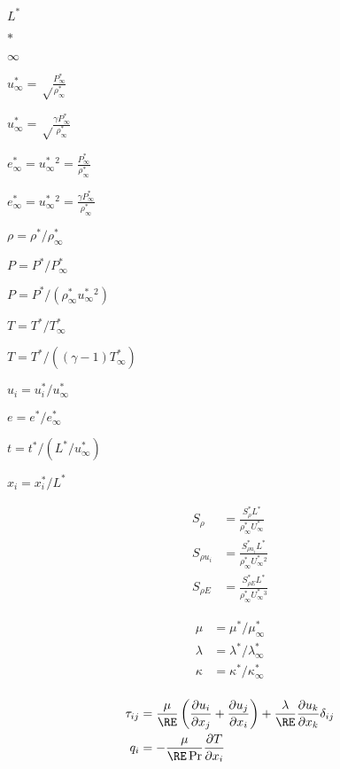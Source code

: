 \documentclass{article}
\begin{document}
$L^*$
\pagebreak

$*$
\pagebreak

$\infty$
\pagebreak

$ u^*_\infty = \sqrt \frac{P^*_\infty}{\rho^*_\infty} $
\pagebreak

$ u^*_\infty = \sqrt \frac{\gamma P^*_\infty}{\rho^*_\infty} $
\pagebreak

$ e^*_\infty = u^*_\infty^2 = \frac{P^*_\infty}{\rho^*_\infty} $
\pagebreak

$ e^*_\infty = u^*_\infty^2 = \frac{\gamma P^*_\infty}{\rho^*_\infty} $
\pagebreak

$ \rho = \rho^* /\rho^*_\infty $
\pagebreak

$ P = P^* /P^*_\infty $
\pagebreak

$ P = P^* /(\rho^*_\infty u^*_\infty^2) $
\pagebreak

$ T = T^* /T^*_\infty $
\pagebreak

$ T = T^* /((\gamma-1)T^*_\infty) $
\pagebreak

$ u_i = u^*_i /u^*_\infty $
\pagebreak

$ e = e^* /e^*_\infty $
\pagebreak

$ t = t^* /(L^* / u^*_\infty) $
\pagebreak

$ x_i = x_i^* /L^* $
\pagebreak

\[\begin{align} S_\rho &= \frac{S^*_\rho L^*}{\rho^*_\infty U^*_\infty} \\ S_{\rho u_i} &= \frac{S^*_{\rho u_i } L^*}{\rho^*_\infty U^*_\infty^2 } \\ S_{\rho E} &= \frac{S^*_{\rho E} L^*}{\rho^*_\infty U^*_\infty^3} \end{align} \]
\pagebreak

\[\begin{align} \mu &= \mu^* /\mu^*_\infty \\ \lambda &= \lambda^* /\lambda^*_\infty \\ \kappa &= \kappa^* /\kappa^*_\infty \\ \end{align} \]
\pagebreak

\[\begin{align} \tau_{ij} &= \frac{\mu}{\RE} \left(\frac{\partial u_i}{\partial x_j} + \frac{\partial u_j}{\partial x_i}\right) + \frac{\lambda}{\RE} \frac{\partial u_k}{\partial x_k}\delta_{ij} \\ q_i &= - \frac{\mu}{\RE \Pr} \frac{\partial T}{\partial x_i} \end{align} \]
\pagebreak
\end{document}
